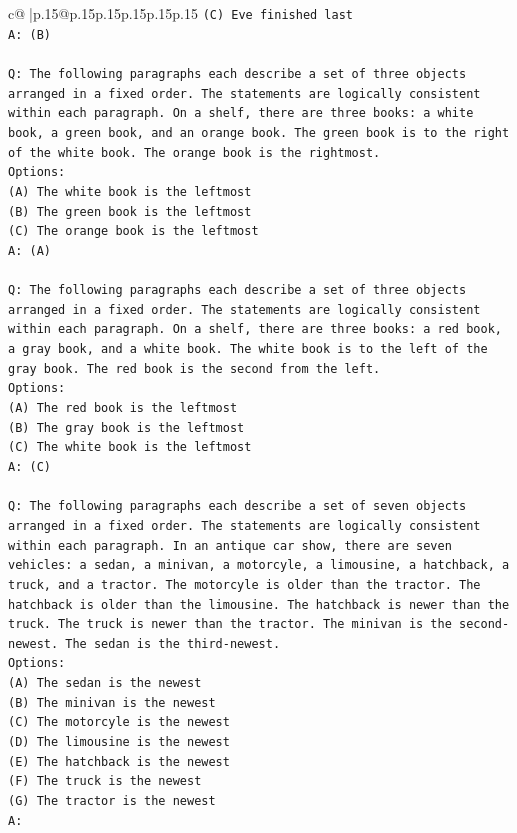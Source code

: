 \documentclass{article}
\begin{document}
{\begin{supertabular}{c@{$\;$}|p{.15\linewidth}@{}p{.15\linewidth}p{.15\linewidth}p{.15\linewidth}p{.15\linewidth}p{.15\linewidth}}
{{{\texttt{(C) Eve finished last} \\
\texttt{A: (B)} \\
\\ 
\texttt{Q: The following paragraphs each describe a set of three objects arranged in a fixed order. The statements are logically consistent within each paragraph. On a shelf, there are three books: a white book, a green book, and an orange book. The green book is to the right of the white book. The orange book is the rightmost.} \\
\texttt{Options:} \\
\texttt{(A) The white book is the leftmost} \\
\texttt{(B) The green book is the leftmost} \\
\texttt{(C) The orange book is the leftmost} \\
\texttt{A: (A)} \\
\\ 
\texttt{Q: The following paragraphs each describe a set of three objects arranged in a fixed order. The statements are logically consistent within each paragraph. On a shelf, there are three books: a red book, a gray book, and a white book. The white book is to the left of the gray book. The red book is the second from the left.} \\
\texttt{Options:} \\
\texttt{(A) The red book is the leftmost} \\
\texttt{(B) The gray book is the leftmost} \\
\texttt{(C) The white book is the leftmost} \\
\texttt{A: (C)} \\
\\ 
\texttt{Q: The following paragraphs each describe a set of seven objects arranged in a fixed order. The statements are logically consistent within each paragraph. In an antique car show, there are seven vehicles: a sedan, a minivan, a motorcyle, a limousine, a hatchback, a truck, and a tractor. The motorcyle is older than the tractor. The hatchback is older than the limousine. The hatchback is newer than the truck. The truck is newer than the tractor. The minivan is the second{-}newest. The sedan is the third{-}newest.} \\
\texttt{Options:} \\
\texttt{(A) The sedan is the newest} \\
\texttt{(B) The minivan is the newest} \\
\texttt{(C) The motorcyle is the newest} \\
\texttt{(D) The limousine is the newest} \\
\texttt{(E) The hatchback is the newest} \\
\texttt{(F) The truck is the newest} \\
\texttt{(G) The tractor is the newest} \\
\texttt{A:} \\
            }
        }
    }
     \\ \\


\end{supertabular}}
\end{document}
